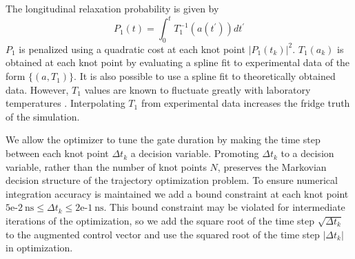
The longitudinal relaxation probability is given by
\begin{equation}
  P_{1}(t) = \int_{0}^{t} T_{1}^{-1}(a(t^{\prime})) dt^{\prime}
\end{equation}
$P_{1}$ is penalized using a quadratic cost at each knot point
${\lvert P_{1}(t_{k}) \rvert}^{2}$.
$T_{1}(a_{k})$ is obtained at each knot point by evaluating
a spline fit to experimental data of the form $\{(a, T_{1})\}$.
It is also possible to use a spline fit to theoretically obtained data.
However, $T_{1}$ values are known to fluctuate greatly
with laboratory temperatures \cite{klimov2018fluctuations}.
Interpolating $T_{1}$ from experimental data
increases the fridge truth of the simulation.

We allow the optimizer to tune the gate duration by
making the time step between each knot point $\Delta t_{k}$
a decision variable. Promoting $\Delta t_{k}$ to a decision variable, rather
than the number of knot points $N$, preserves the
Markovian decision structure of the trajectory
optimization problem. To ensure numerical
integration accuracy is maintained we add a bound
constraint at each knot point
$5\textrm{e-}2 \ \textrm{ns} \le
\Delta t_{k} \le 2\textrm{e-}1 \ \textrm{ns}$.
This bound constraint may be
violated for intermediate iterations of the optimization,
so we add the square root of the time step $\sqrt{\Delta t_{k}}$
to the augmented control vector and use the squared root
of the time step $\lvert \Delta t_{k} \rvert$ in optimization.

